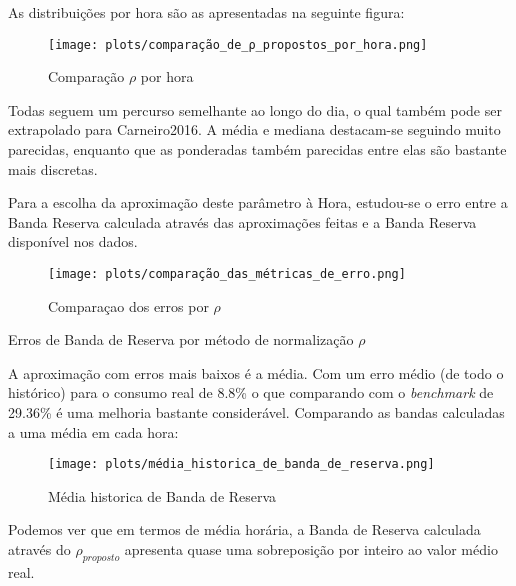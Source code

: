 As distribuições por hora são as apresentadas na seguinte figura:

\begin{figure}[H]
    \centering
    \texttt{[image: plots/comparação\_de\_ρ\_propostos\_por\_hora.png]}
    \caption{Comparação $\rho$ por hora}
    \label{fig:comparação_de_ρ_propostos_por_hora}
\end{figure}

Todas seguem um percurso semelhante ao longo do dia, o qual também pode ser extrapolado para Carneiro2016. A média e mediana destacam-se seguindo muito parecidas, enquanto que as ponderadas também parecidas entre elas são bastante mais discretas.\par
Para a escolha da aproximação deste parâmetro à Hora, estudou-se o erro entre a Banda Reserva calculada através das aproximações feitas e a Banda Reserva disponível nos dados.\par


\begin{figure}[H]
    \centering
    \texttt{[image: plots/comparação\_das\_métricas\_de\_erro.png]}
    \caption{Comparaçao dos erros por $\rho$}
    \label{fig:comparação_das_métricas_de_erro}
\end{figure}


\begin{table}[H]
    \centering
    \caption{Erros de Banda de Reserva por método de normalização $\rho$}    
    \resizebox{0.65\linewidth}{!}{}
    \label{fig:tabela_estudo_1_medias}
    \end{table}


A aproximação com erros mais baixos é a média. Com um erro médio (de todo o histórico) para o consumo real de 8.8\% o que comparando com o \textit{benchmark} de 29.36\% é uma melhoria  bastante considerável. Comparando as bandas calculadas a uma média em cada hora:\par

\begin{figure}[H]
    \centering
    \texttt{[image: plots/média\_historica\_de\_banda\_de\_reserva.png]}
    \caption{Média historica de Banda de Reserva}
\end{figure}

Podemos ver que em termos de média horária, a Banda de Reserva calculada através do $\rho_{proposto}$ apresenta quase uma sobreposição por inteiro ao valor médio real.\par

